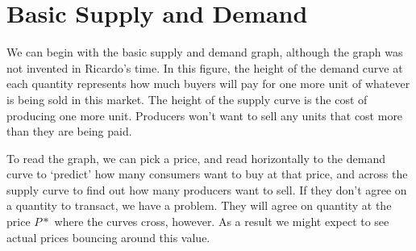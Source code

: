 \section{Basic Supply and Demand}
We can begin with the basic supply and demand graph, although the graph was not invented in Ricardo's time. In this figure, the height of the demand curve at each quantity represents how much buyers will pay for  one more unit of whatever is being sold in this market. The height of the supply curve is the cost of producing one more unit. Producers won't want to sell any units that cost more than they are being paid.

To read the graph, we can pick a price, and read horizontally to the demand curve to `predict' how many consumers  want to buy at that price, and across  the supply curve to find out how many producers want to sell. If they don't agree on a quantity to transact, we have a problem. They will agree on quantity at the price $P*$ where the curves cross, however. As a result we might expect to see actual  prices bouncing around this value.

